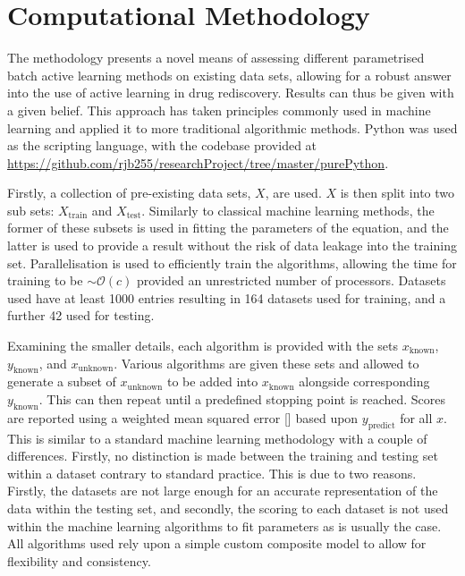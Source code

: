 
\section{Computational Methodology}
The methodology presents a novel means of assessing different parametrised batch active learning methods on existing data sets, allowing for a robust answer into the use of active learning in drug rediscovery. Results can thus be given with a given belief. This approach has taken principles commonly used in machine learning and applied it to more traditional algorithmic methods. Python was used as the scripting language, with the codebase provided at \url{https://github.com/rjb255/researchProject/tree/master/purePython}.

Firstly, a collection of pre-existing data sets, $X$, are used. $X$ is then split into two sub sets: $X_{\mathrm{train}}$ and $X_\mathrm{test}$. Similarly to classical machine learning methods, the former of these subsets is used in fitting the parameters of the equation, and the latter is used to provide a result without the risk of data leakage into the training set. Parallelisation is used to efficiently train the algorithms, allowing the time for training to be $\sim{}\mathcal{O}(c)$ provided an unrestricted number of processors. Datasets used have at least 1000 entries resulting in 164 datasets used for training, and a further 42 used for testing.

Examining the smaller details, each algorithm is provided with the sets $x_\mathrm{known}$, $y_\mathrm{known}$, and $x_\mathrm{unknown}$. Various algorithms are given these sets and allowed to generate a subset of $x_\mathrm{unknown}$ to be added into $x_\mathrm{known}$ alongside corresponding $y_\mathrm{known}$. This can then repeat until a predefined stopping point is reached. Scores are reported using a weighted mean squared error [] based upon $y_\mathrm{predict}$ for all $x$. This is similar to a standard machine learning methodology with a couple of differences. Firstly, no distinction is made between the training and testing set within a dataset contrary to standard practice. This is due to two reasons. Firstly, the datasets are not large enough for an accurate representation of the data within the testing set, and secondly, the scoring to each dataset is not used within the machine learning algorithms to fit parameters as is usually the case. All algorithms used rely upon a simple custom composite model to allow for flexibility and consistency.


